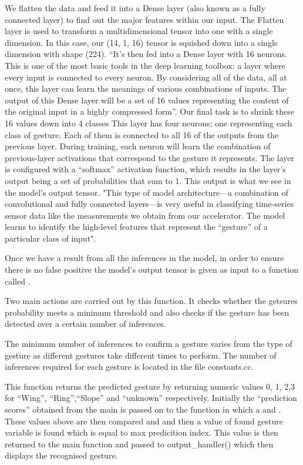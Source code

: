 We flatten the data and feed it into a Dense layer (also known as a fully connected layer) to find out the major features within our input. 
The Flatten layer is used to transform a multidimensional tensor into one with a
single dimension. In this case, our (14, 1, 16) tensor is squished down into a single
dimension with shape (224).
``It's then fed into a Dense layer with 16 neurons. This is one of the most basic tools in
the deep learning toolbox: a layer where every input is connected to every neuron. By
considering all of the data, all at once, this layer can learn the meanings of various
combinations of inputs. The output of this Dense layer will be a set of 16 values representing
the content of the original input in a highly compressed form''.\cite{Warden:2020}
Our final task is to shrink these 16 values down into 4 classes
This layer has four neurons; one representing each class of gesture. Each of them is
connected to all 16 of the outputs from the previous layer. During training, each neuron
will learn the combination of previous-layer activations that correspond to the
gesture it represents.
The layer is configured with a ``softmax'' activation function, which results in the layer's
output being a set of probabilities that sum to 1. This output is what we see in the
model's output tensor.
"This type of model architecture—a combination of convolutional and fully connected
layers—is very useful in classifying time-series sensor data like the measurements we
obtain from our accelerator. The model learns to identify the high-level features
that represent the “gesture” of a particular class of input".\cite{Warden:2020}

Once we have a result from all the inferences in the model, in order to ensure there is no false positive the model's output tensor is given as input to a function called .

Two main actions are carried out by this function. It checks whether the getsures probability meets a minimum threshold and also checks if the gesture has been detected over a certain number of inferences. 

The minimum number of inferences to confirm a gesture varies from the type of gesture as different gestures take different times to perform. The number of inferences required for each gesture is located in the file constants.cc. \cite{Warden:2020}

This function  returns the predicted gesture by returning numeric values 0, 1, 2,3 for ``Wing'', ``Ring'',``Slope'' and ``unknown''  respectively. 
Initially the ``prediction scores'' obtained from the main is passed on to the function in which a  and .
These values  above are then compared  and  and then a value of found gesture variable is found which is equal to max predicition index. This value is then returned to the main function and passed to output\_handler() which then displays the recognised gesture. \cite{Warden:2020}


